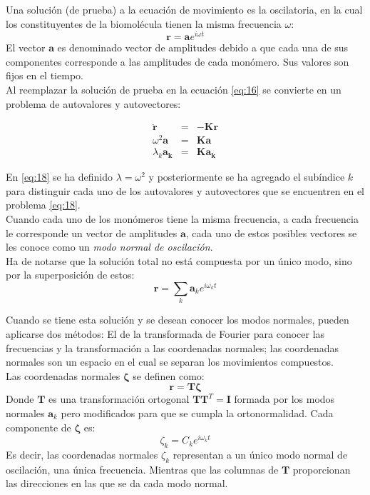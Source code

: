 Una soluci\'{o}n (de prueba) a la ecuaci\'{o}n de movimiento es la oscilatoria, en la cual los constituyentes de la biomol\'{e}cula tienen la misma frecuencia $\omega$:
\begin{equation}\label{eq:17}
\mathbf{r}=\mathbf{a}e^{i\omega t}
\end{equation}
El vector $\mathbf{a}$ es denominado vector de amplitudes debido a que cada una de sus componentes corresponde a las amplitudes de cada mon\'{o}mero. Sus valores son fijos en el tiempo.\\

Al reemplazar la soluci\'{o}n de prueba en la ecuaci\'{o}n \eqref{eq:16} se convierte en un problema de autovalores y autovectores:

\begin{eqnarray}\label{eq:18}
\ddot{\mathbf{r}}&=&-\mathbf{K}\mathbf{r} \nonumber \\
\omega^2\mathbf{a}&=&\mathbf{K}\mathbf{a} \nonumber \\
\lambda_{k}\mathbf{a_{k}}&=&\mathbf{K}\mathbf{a_{k}}
\end{eqnarray}

En \eqref{eq:18} se ha definido $\lambda=\omega^2$ y posteriormente se ha agregado el sub\'{i}ndice $k$ para distinguir cada uno de los autovalores y autovectores que se encuentren en el problema \eqref{eq:18}.\\
Cuando cada uno de los mon\'{o}meros tiene la misma frecuencia, a cada frecuencia le corresponde un vector de amplitudes $\mathbf{a}$, cada uno de estos posibles vectores se les conoce como un \textit{modo normal de oscilaci\'{o}n}.\\

Ha de notarse que la soluci\'{o}n total no est\'{a} compuesta por un \'{u}nico modo, sino por la superposici\'{o}n de estos:
\begin{equation}\label{eq:tot}
\mathbf{r}=\sum_k\mathbf{a}_ke^{i\omega_k t}
\end{equation}

Cuando se tiene esta soluci\'{o}n y se desean conocer los modos normales, pueden aplicarse dos m\'{e}todos: El de la transformada de Fourier para conocer las frecuencias y la transformaci\'{o}n a las coordenadas normales; las coordenadas normales son un espacio en el cual se separan los movimientos compuestos.\\

Las coordenadas normales $\mathbf{\zeta}$ se definen como:
\begin{equation}
\mathbf{r}=\mathbf{T}\mathbf{\zeta}
\end{equation}
Donde $\mathbf{T}$ es una transformaci\'{o}n ortogonal  $\mathbf{T}\mathbf{T}^T=\mathbf{I}$ formada por los modos normales $\mathbf{a}_k$  pero modificados para que se cumpla la ortonormalidad. Cada componente de $\mathbf{\zeta}$ es:
\begin{equation}\label{eq:nor}
\zeta_k=C_k e^{i\omega_k t}
\end{equation}
Es decir, las coordenadas normales $\zeta_k$ representan a un \'{u}nico modo normal de oscilaci\'{o}n, una \'{u}nica frecuencia. Mientras que las columnas de $\mathbf{T}$ proporcionan las direcciones en las que se da cada modo normal.\\


